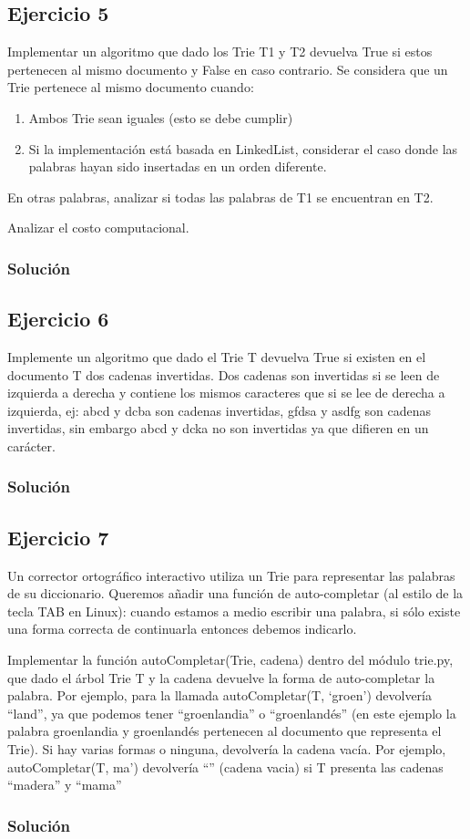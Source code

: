 \documentclass{article}
\begin{document}
\subsection*{Ejercicio 5}
Implementar un algoritmo que dado los Trie T1 y T2 devuelva True si estos pertenecen al mismo documento y False en caso contrario. Se considera que un Trie pertenece al mismo documento cuando:
\begin{enumerate}
    \item Ambos Trie sean iguales (esto se debe cumplir)
    \item Si la implementación está basada en LinkedList, considerar el caso donde las palabras hayan sido insertadas en un orden diferente.
\end{enumerate}
En otras palabras, analizar si todas las palabras de T1 se encuentran en T2.

Analizar el costo computacional.
\subsubsection*{Solución}


\subsection*{Ejercicio 6}
Implemente un algoritmo que dado el Trie T devuelva True si existen en el documento T dos cadenas invertidas. Dos cadenas son invertidas si se leen de izquierda a derecha y contiene los mismos caracteres que si se lee de derecha a izquierda, ej: abcd y dcba son cadenas invertidas, gfdsa y asdfg son cadenas invertidas, sin embargo abcd y dcka no son invertidas ya que difieren en un carácter.
\subsubsection*{Solución}


\subsection*{Ejercicio 7}
Un corrector ortográfico interactivo utiliza un Trie para representar las palabras de su diccionario. Queremos añadir una función de auto-completar (al estilo de la tecla TAB en Linux): cuando estamos a medio escribir una palabra, si sólo existe una forma correcta de continuarla entonces debemos indicarlo.

Implementar la función autoCompletar(Trie, cadena) dentro del módulo trie.py, que dado el árbol Trie T y la cadena devuelve la forma de auto-completar la palabra. Por ejemplo, para la llamada autoCompletar(T, ‘groen’) devolvería “land”, ya que podemos tener “groenlandia” o “groenlandés” (en este ejemplo la palabra groenlandia y groenlandés pertenecen al documento que representa el Trie). Si hay varias formas o ninguna, devolvería la cadena vacía. Por ejemplo, autoCompletar(T, ma’) devolvería “” (cadena vacia) si T presenta las cadenas “madera” y “mama”
\subsubsection*{Solución}
\end{document}
